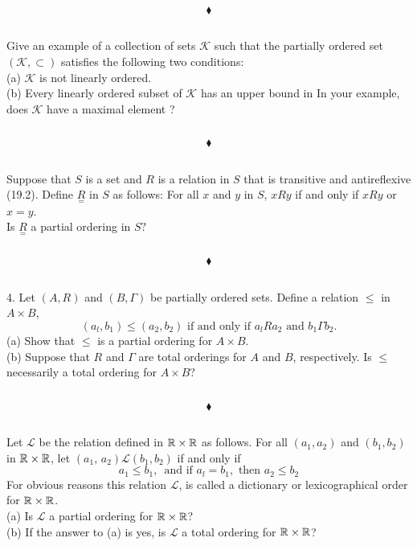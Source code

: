 $$\blacklozenge$$

\subsection{}
\begin{tcolorbox}
Give an example of a collection of sets $\mathscr{K}$ such that the partially ordered set $(\mathscr{K}, \subset)$ satisfies the following two conditions: \\
(a) $\mathscr{K}$ is not linearly ordered.\\
(b) Every linearly ordered subset of $\mathscr{K}$ has an upper bound in In your example, does $\mathscr{K}$ have a maximal element ? 
\end{tcolorbox}
$$ $$

$$\blacklozenge$$

\subsection{}
\begin{tcolorbox}
Suppose that $S$ is a set and $R$ is a relation in $S$ that is transitive and antireflexive (19.2). Define $\underset{=}{R}$ in $S$ as follows: For all $x$ and $y$ in $S$, $x R y$ if and only if $x R y$ or $x = y$. \\
Is $\underset{=}{R}$ a partial ordering in $S?$ 
\end{tcolorbox}
$$ $$

$$\blacklozenge$$

\subsection{}
\begin{tcolorbox}
4. Let $(A, R)$ and $(B, \Gamma)$ be partially ordered sets. Define a relation $\leq$ in $A\times B$, 
$$ (a_l, b_1) \leq (a_2, b_2) \text{ if and only if } a_l R a_2 \text{ and }  b_1\Gamma b_2.$$
(a) Show that $\leq$ is a partial ordering for $A \times B$.\\
(b) Suppose that $R$ and $\Gamma$ are total orderings for $A$ and $B$, respectively. Is $\leq$ necessarily a total ordering for $A \times B$? 
\end{tcolorbox}
$$ $$

$$\blacklozenge$$

\subsection{}
\begin{tcolorbox}
Let $\mathscr{L}$  be the relation defined in $\mathbb{R}\times\mathbb{R}$ as follows. For all $(a_1, a_2)$ and $(b_1, b_2)$ in $\mathbb{R}\times\mathbb{R}$, let $(a_1,\, a_2)\mathscr{L} (b_1, b_2)$ if and only if 
$$a_1\leq b_1,\,\text{ and if } a_l = b_1, \text{ then } a_2\leq b_2$$ For obvious reasons this relation $\mathscr{L}$, is called a dictionary or lexicographical order for $\mathbb{R}\times\mathbb{R}$.\\
(a) Is $\mathscr{L}$ a partial ordering for $\mathbb{R}\times\mathbb{R}$?\\
(b) If the answer to (a) is yes, is $\mathscr{L}$  a total ordering for $\mathbb{R}\times\mathbb{R}$? 
\end{tcolorbox}
$$ $$

